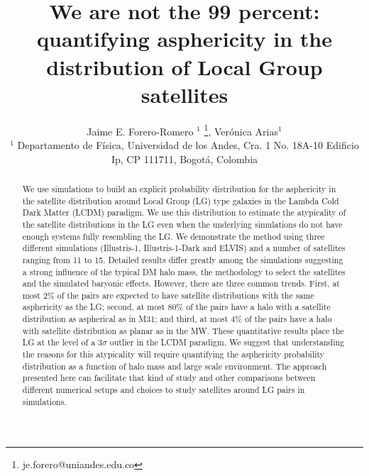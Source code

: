 \documentclass[a4paper,fleqn,usenatbib]{mnras}
\begin{document}
\title[LG satellites distribution asphericity]{We are not the 99 percent: quantifying
  asphericity in the distribution of Local Group satellites}
\author[J.E. Forero-Romero \& V. Arias]
{Jaime E. Forero-Romero $^{1}$ \thanks{je.forero@uniandes.edu.co},
Ver\'onica Arias$^1$\\
$^1$ Departamento de F\'isica, Universidad de los Andes, Cra. 1
  No. 18A-10 Edificio Ip, CP 111711, Bogot\'a, Colombia \\
}

\maketitle

\begin{abstract}
We use simulations to build an explicit probability distribution for
the asphericity in the satellite distribution around Local Group (LG)
type galaxies in the Lambda Cold Dark Matter (LCDM) paradigm. 
We use this distribution to estimate the  atypicality
of the satellite distributions in the LG even when the underlying
simulations do not have enough systems fully resembling the LG.
We demonstrate the method using three different simulations
(Illustris-1,  Illustris-1-Dark and ELVIS) and a number of satellites
ranging from 11 to 15.
Detailed results differ greatly among the simulations suggesting a
strong influence of the typical DM halo mass, the methodology to
select the satellites and the simulated baryonic effects. 
However, there are three common trends.
First, at most $2\%$ of the pairs are expected to have satellite
distributions with the same asphericity as the LG; second,
at most $80\%$ of the pairs have a halo with a satellite
distribution as aspherical as in M31; and third, at most $4\%$ of the
pairs have a halo with satellite distribution as planar as in the MW. 
These quantitative results place the LG at the level of a $3\sigma$
outlier in the LCDM paradigm. 
We suggest that understanding the reasons for this atypicality
will require quantifying the asphericity probability distribution as a
function of halo mass and large scale environment.
The approach presented here can facilitate that kind of study and other
comparisons between different numerical setups and choices to study
satellites around LG pairs in simulations.  
\end{abstract}
\end{document}
